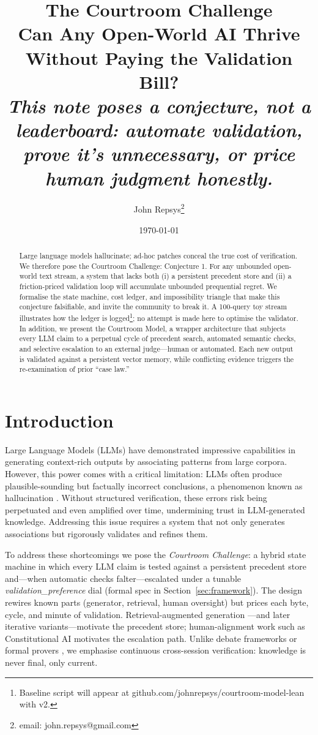 \documentclass[11pt]{article}
\title{The Courtroom Challenge\\\large Can Any Open-World AI Thrive Without Paying the Validation Bill?\\[1em]\small\textit{This note poses a conjecture, not a leaderboard: automate validation, prove it's unnecessary, or price human judgment honestly.}}
\author{John Repsys\thanks{email: john.repsys@gmail.com}}
\date{\today}
\begin{document}
\maketitle
\begin{abstract}
  Large language models hallucinate; ad-hoc patches conceal the true cost of verification. We therefore pose the Courtroom Challenge:
  Conjecture 1. For any unbounded open-world text stream, a system that lacks both (i) a persistent precedent store and (ii) a friction-priced validation loop will accumulate unbounded prequential regret.
  We formalise the state machine, cost ledger, and impossibility triangle that make this conjecture falsifiable, and invite the community to break it. A 100-query toy stream illustrates how the ledger is logged\footnote{Baseline script will appear at github.com/johnrepsys/courtroom-model-lean with v2.}; no attempt is made here to optimise the validator. In addition, we present the Courtroom Model, a wrapper architecture that subjects every LLM claim to a perpetual cycle of precedent search, automated semantic checks, and selective escalation to an external judge—human or automated. Each new output is validated against a persistent vector memory, while conflicting evidence triggers the re-examination of prior “case law.”
\end{abstract}

\section{Introduction}
\label{sec:intro}
Large Language Models (LLMs) have demonstrated impressive capabilities in generating context-rich outputs by associating patterns from large corpora. However, this power comes with a critical limitation: LLMs often produce plausible-sounding but factually incorrect conclusions, a phenomenon known as hallucination \citep{marcus2020nextdecade,shinn2023reflexion}. Without structured verification, these errors risk being perpetuated and even amplified over time, undermining trust in LLM-generated knowledge. Addressing this issue requires a system that not only generates associations but rigorously validates and refines them.

To address these shortcomings we pose the \textit{Courtroom Challenge}: a
hybrid state machine in which every LLM claim is tested against a persistent
precedent store and—when automatic checks falter—escalated under a
tunable \textit{validation\_preference} dial (formal spec in
Section~\ref{sec:framework}).  The design rewires known parts
(generator, retrieval, human oversight) but prices each byte, cycle,
and minute of validation.  Retrieval-augmented generation \citep{lewis2020rag,
fan2024ragsurvey}—and later iterative variants—motivate the precedent
store; human-alignment work such as Constitutional AI
\citep{bai2022constitutional} motivates the escalation path.
Unlike debate frameworks \citep{chen2024reconcile,madaan2023selfrefine} or formal
provers \citep{wang2025malot}, we emphasise continuous cross-session
verification: knowledge is never final, only current.
\end{document}
